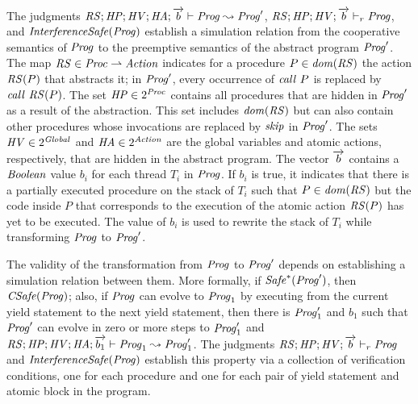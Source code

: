 The judgments $\mathit{RS};\mathit{HP};\mathit{HV};\mathit{HA};\overrightarrow{b} \vdash \mathit{Prog} \leadsto \mathit{Prog}'$,
$\mathit{RS};\mathit{HP};\mathit{HV};\overrightarrow{b} \vdash_r \mathit{Prog}$, and $\mathit{InterferenceSafe}(\mathit{Prog})$ establish a simulation relation from 
the cooperative semantics of $\mathit{Prog}$ to the preemptive semantics of the abstract program $\mathit{Prog}'$.
The map $\mathit{RS} \in \mathit{Proc} \rightharpoonup \mathit{Action}$ indicates for a procedure $P \in \mathit{dom}(\mathit{RS})$ 
the action $\mathit{RS}(P)$ that abstracts it;
in $\mathit{Prog}'$, every occurrence of $\mathit{call}\ P$ is replaced by $\mathit{call}\ \mathit{RS}(P)$.
The set $\mathit{HP} \in 2^{\mathit{Proc}}$ 
contains all procedures that are hidden in $\mathit{Prog}'$ as a result of the abstraction.
This set includes $\mathit{dom}(\mathit{RS})$ but can also contain other procedures whose invocations 
are replaced by $\mathit{skip}$ in $\mathit{Prog}'$.
The sets $\mathit{HV} \in 2^{\mathit{Global}}$ and $\mathit{HA} \in 2^{\mathit{Action}}$ are the global variables and atomic actions, 
respectively, that are hidden in the abstract program.
The vector $\overrightarrow{b}$ contains a $\mathit{Boolean}$ value $b_i$ for each thread $T_i$ in $\mathit{Prog}$.
If $b_i$ is true, it indicates that there is a partially executed procedure on the stack of $T_i$ 
such that $P \in \mathit{dom}(\mathit{RS})$ but the code inside $P$ that corresponds to the execution of the atomic action $\mathit{RS}(P)$
has yet to be executed.
The value of $b_i$ is used to rewrite the stack of $T_i$ while transforming $\mathit{Prog}$ to $\mathit{Prog}'$.

The validity of the transformation from $\mathit{Prog}$ to $\mathit{Prog}'$ depends on establishing a simulation relation between them.
More formally, if $\mathit{Safe}^*(\mathit{Prog}')$, then $\mathit{CSafe}(\mathit{Prog})$;
also, if $\mathit{Prog}$ can evolve to $\mathit{Prog}_1$ by executing from the current yield statement to the next yield statement, 
then there is $\mathit{Prog}'_1$ and $b_1$ such that $\mathit{Prog}'$ can evolve in zero or more steps to $\mathit{Prog}'_1$ 
and $\mathit{RS};\mathit{HP};\mathit{HV};\mathit{HA};\overrightarrow{b_1} \vdash \mathit{Prog}_1 \leadsto \mathit{Prog}'_1$.
The judgments $\mathit{RS};\mathit{HP};\mathit{HV};\overrightarrow{b} \vdash_r \mathit{Prog}$ and $\mathit{InterferenceSafe}(\mathit{Prog})$ 
establish this property via a collection of verification conditions, one for each procedure and 
one for each pair of yield statement and atomic block in the program.

